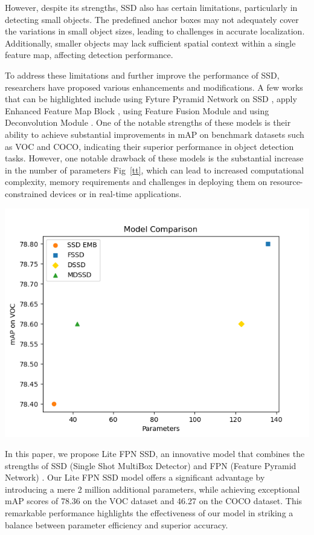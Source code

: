 \documentclass[a4paper]{article}
\begin{document}
	However, despite its strengths, SSD also has certain limitations, particularly in detecting small objects. The predefined anchor boxes may not adequately cover the variations in small object sizes, leading to challenges in accurate localization. Additionally, smaller objects may lack sufficient spatial context within a single feature map, affecting detection performance.

	To address these limitations and further improve the performance of SSD, researchers have proposed various enhancements and modifications. A few works that can be highlighted include using Fyture Pyramid Network \cite{fpn} on SSD \cite{fpnssd}, apply Enhanced Feature Map Block \cite{ssdemb}, using Feature Fusion Module \cite{fssd} and using Deconvolution Module \cite{dssd, mdssd}. One of the notable strengths of these models is their ability to achieve substantial improvements in mAP on benchmark datasets such as VOC and COCO, indicating their superior performance in object detection tasks. However, one notable drawback of these models is the substantial increase in the number of parameters Fig~\ref{tt}, which can lead to increased computational complexity, memory requirements and challenges in deploying them on resource-constrained devices or in real-time applications.
	
	\begin{center}
		\includegraphics[width=0.7\linewidth]{../fig/param_mAP_VOC}
		\label{tt}
	\end{center}
	
	In this paper, we propose Lite FPN SSD, an innovative model that combines the strengths of SSD (Single Shot MultiBox Detector) and FPN (Feature Pyramid Network) \cite{fpn}. Our Lite FPN SSD model offers a significant advantage by introducing a mere 2 million additional parameters, while achieving exceptional mAP scores of 78.36 on the VOC dataset and 46.27 on the COCO dataset. This remarkable performance highlights the effectiveness of our model in striking a balance between parameter efficiency and superior accuracy.
	
\end{document}
